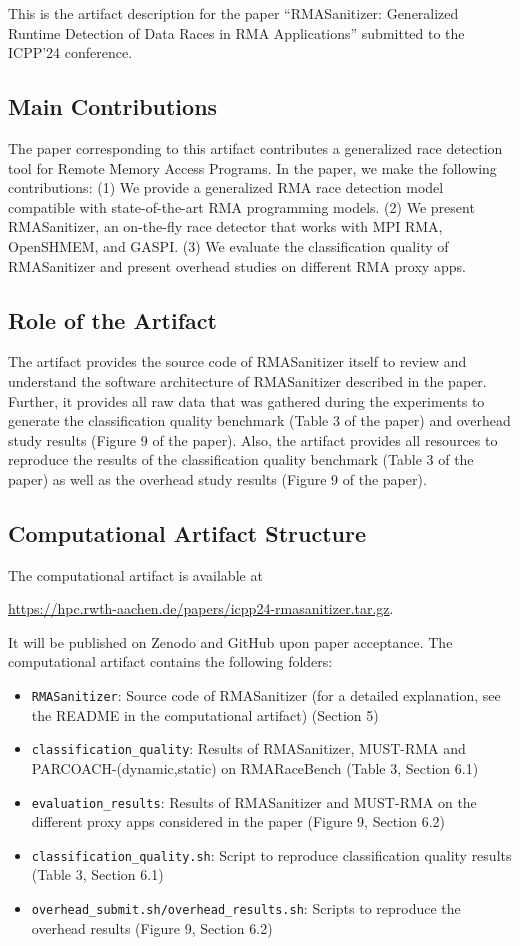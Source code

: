 \documentclass[twoside]{article}
\begin{document}
This is the artifact description for the paper ``RMASanitizer: Generalized Runtime Detection of Data Races in RMA Applications'' submitted to the ICPP'24 conference.

\subsection*{Main Contributions}
The paper corresponding to this artifact contributes a generalized race detection tool for Remote Memory Access Programs. In the paper, we make the following contributions: (1) We provide a generalized RMA race detection model compatible with state-of-the-art RMA programming models. (2) We present RMASanitizer, an on-the-fly race detector that works with MPI RMA, OpenSHMEM, and GASPI. (3) We evaluate the classification quality of RMASanitizer and present overhead studies on different RMA proxy apps.

\subsection*{Role of the Artifact}
The artifact provides the source code of RMASanitizer itself to review and understand the software architecture of RMASanitizer described in the paper. Further, it provides all raw data that was gathered during the experiments to generate the classification quality benchmark (Table 3 of the paper) and overhead study results (Figure 9 of the paper). Also, the artifact provides all resources to reproduce the results of the classification quality benchmark (Table 3 of the paper) as well as the overhead study results (Figure 9 of the paper).


\subsection*{Computational Artifact Structure}
The computational artifact is available at 
\begin{center}
\url{https://hpc.rwth-aachen.de/papers/icpp24-rmasanitizer.tar.gz}.
\end{center}

It will be published on Zenodo and GitHub upon paper acceptance.
The computational artifact contains the following folders:
\begin{itemize}
    \item \texttt{RMASanitizer}: Source code of RMASanitizer (for a detailed explanation, see the README in the computational artifact) (Section 5)
    \item \texttt{classification\_quality}: Results of RMASanitizer, MUST-RMA and PARCOACH-(dynamic,static) on RMARaceBench (Table 3, Section 6.1)
    \item \texttt{evaluation\_results}: Results of RMASanitizer and MUST-RMA on the different proxy apps considered in the paper (Figure 9, Section 6.2)
    \item \texttt{classification\_quality.sh}: Script to reproduce classification quality results (Table 3, Section 6.1)
    \item \texttt{overhead\_submit.sh/overhead\_results.sh}: Scripts to reproduce the overhead results (Figure 9, Section 6.2)
\end{itemize}
\end{document}
